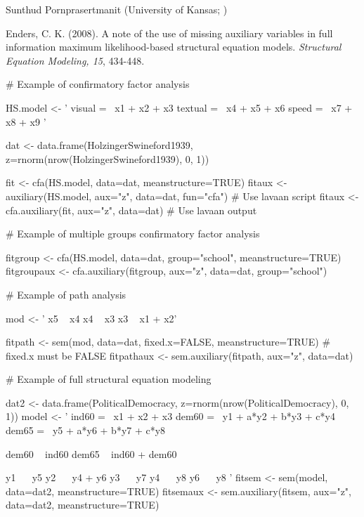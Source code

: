 \documentclass[a4paper]{book}
\begin{document}
%
\begin{Author}\relax
Sunthud Pornprasertmanit (University of Kansas; )
\end{Author}
%
\begin{References}\relax
Enders, C. K. (2008). A note of the use of missing auxiliary variables in full information maximum likelihood-based structural equation models. \emph{Structural Equation Modeling, 15}, 434-448.
\end{References}
%
\begin{SeeAlso}\relax
{}
\end{SeeAlso}
%
\begin{Examples}
\begin{ExampleCode}
# Example of confirmatory factor analysis

HS.model <- ' visual  =~ x1 + x2 + x3
              textual =~ x4 + x5 + x6
              speed   =~ x7 + x8 + x9 '
			  
dat <- data.frame(HolzingerSwineford1939, z=rnorm(nrow(HolzingerSwineford1939), 0, 1))
			  
fit <- cfa(HS.model, data=dat, meanstructure=TRUE) 
fitaux <- auxiliary(HS.model, aux="z", data=dat, fun="cfa") # Use lavaan script
fitaux <- cfa.auxiliary(fit, aux="z", data=dat) # Use lavaan output

# Example of multiple groups confirmatory factor analysis

fitgroup <- cfa(HS.model, data=dat, group="school", meanstructure=TRUE)
fitgroupaux <- cfa.auxiliary(fitgroup, aux="z", data=dat, group="school")

# Example of path analysis

mod <- ' x5 ~ x4
x4 ~ x3
x3 ~ x1 + x2'

fitpath <- sem(mod, data=dat, fixed.x=FALSE, meanstructure=TRUE) # fixed.x must be FALSE
fitpathaux <- sem.auxiliary(fitpath, aux="z", data=dat)

# Example of full structural equation modeling

dat2 <- data.frame(PoliticalDemocracy, z=rnorm(nrow(PoliticalDemocracy), 0, 1))
model <- ' 
     ind60 =~ x1 + x2 + x3
     dem60 =~ y1 + a*y2 + b*y3 + c*y4
     dem65 =~ y5 + a*y6 + b*y7 + c*y8

    dem60 ~ ind60
    dem65 ~ ind60 + dem60

    y1 ~~ y5
    y2 ~~ y4 + y6
    y3 ~~ y7
    y4 ~~ y8
    y6 ~~ y8
'
fitsem <- sem(model, data=dat2, meanstructure=TRUE)
fitsemaux <- sem.auxiliary(fitsem, aux="z", data=dat2, meanstructure=TRUE)


\end{ExampleCode}
\end{Examples}
\end{document}
